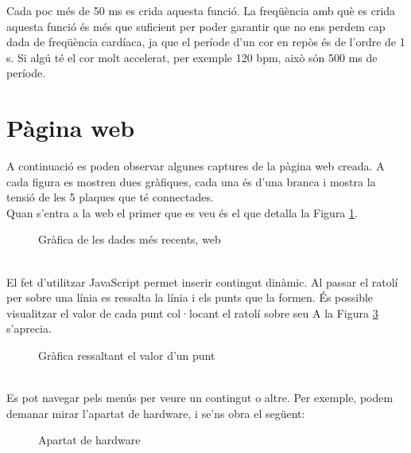 \begin{spacing}{1.5}
%
\noindent Cada poc més de 50 ms es crida aquesta funció. La freqüència amb què es crida aquesta funció és més que suficient per poder garantir que no ens perdem cap dada de freqüència cardíaca, ja que el període d'un cor en repòs és de l'ordre de 1 s. Si algú té el cor molt accelerat, per exemple 120 bpm, això són 500 ms de període.

\section{Pàgina web}
\noindent A continuació es poden observar algunes captures de la pàgina web creada. A cada figura es mostren dues gràfiques, cada una és d'una branca i mostra la tensió de les 5 plaques que té connectades.\\
\newline Quan s'entra a la web el primer que es veu és el que detalla la Figura \ref{fig:1}.

\begin{figure}[H]
\begin{center}
\end{center}
\caption{Gràfica de les dades més recents, web}
\label{fig:1}
\end{figure}

\noindent \\ El fet d'utilitzar JavaScript permet inserir contingut dinàmic. Al passar el ratolí per sobre una línia es ressalta la línia i els punts que la formen. És possible visualitzar el valor de cada punt col·locant el ratolí sobre seu A la Figura \ref{fig:2} s'aprecia.
\begin{figure}[H]
\begin{center}
\end{center}
\caption{Gràfica ressaltant el valor d'un punt}
\label{fig:2}
\end{figure}

\noindent \\ Es pot navegar pels menús per veure un contingut o altre. Per exemple, podem demanar mirar l'apartat de hardware, i se'ns obra el següent:
\begin{figure}[H]
\begin{center}
\end{center}
\caption{Apartat de hardware}
\label{fig:2}
\end{figure}








\end{spacing}
